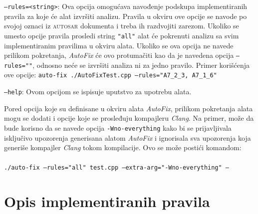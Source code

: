 \documentclass[12pt,oneside]{memoir}
\begin{document}
\begin{description}
    \item \texttt{--rules=<string>}: Ova opcija omogu\'{c}ava navođenje podskupa implementiranih pravila za koje \'{c}e alat izvr\v{s}iti analizu. Pravila u okviru ove opcije
    se navode po svojoj oznaci iz \textsc{autosar} dokumenta i treba ih razdvojiti zarezom. Ukoliko se umesto opcije pravila prosledi string \texttt{"all"} alat \'{c}e pokrenuti
    analizu sa svim implementiranim pravilima u okviru alata. Ukoliko se ova opcija ne navede prilikom pokretanja, \textit{AutoFix} \'{c}e ovo protuma\v{c}iti kao da je navedena opcija \texttt{--rules=""}, odnosno ne\'{c}e se izvr\v{s}iti analiza ni za jedno pravilo.
    Primer kori\v{s}\'{c}enja ove opcije: \newline\newline
    \texttt{auto-fix ./AutoFixTest.cpp --rules="A7\_2\_3, A7\_1\_6"} \\
    \item \texttt{--help}: Ovom opcijom se ispisuje uputstvo za upotrebu alata.
  \end{description}

Pored opcija koje su definisane u okviru alata \textit{AutoFix}, prilikom pokretanja alata mogu se dodati i opcije koje se prosleđuju kompajleru \textit{Clang}. Na primer, mo\v{z}e da bude korisno da se navede opcija \texttt{-Wno-everything} kako bi se prijavljivala isklju\v{c}ivo upozorenja generisana alatom \textit{AutoFix} i ignorisala sva upozorenja koja generi\v{s}e kompajler \textit{Clang} tokom kompilacije. Ovo se mo\v{z}e posti\'{c}i komandom: \\ \\
\texttt{./auto-fix --rules="all" test.cpp --extra-arg="-Wno-everything" --}


\section{Opis implementiranih pravila}
\end{document}
